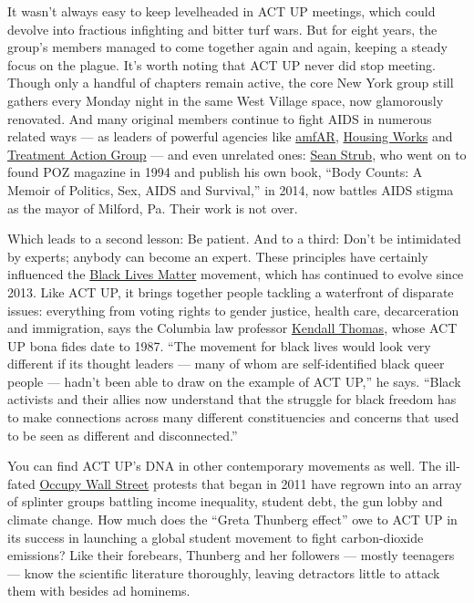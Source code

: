 It wasn't always easy to keep levelheaded in ACT UP meetings, which
could devolve into fractious infighting and bitter turf wars. But for
eight years, the group's members managed to come together again and
again, keeping a steady focus on the plague. It's worth noting that ACT
UP never did stop meeting. Though only a handful of chapters remain
active, the core New York group still gathers every Monday night in the
same West Village space, now glamorously renovated. And many original
members continue to fight AIDS in numerous related ways --- as leaders
of powerful agencies like \href{https://www.amfar.org/}{amfAR},
\href{https://www.housingworks.org/}{Housing Works} and
\href{https://www.treatmentactiongroup.org/}{Treatment Action Group} ---
and even unrelated ones: \href{http://www.seanstrub.com/}{Sean Strub},
who went on to found POZ magazine in 1994 and publish his own book,
``Body Counts: A Memoir of Politics, Sex, AIDS and Survival,'' in 2014,
now battles AIDS stigma as the mayor of Milford, Pa. Their work is not
over.

Which leads to a second lesson: Be patient. And to a third: Don't be
intimidated by experts; anybody can become an expert. These principles
have certainly influenced the
\href{https://www.nytimes.com/2018/03/28/insider/black-lives-matter-stress.html}{Black
Lives Matter} movement, which has continued to evolve since 2013. Like
ACT UP, it brings together people tackling a waterfront of disparate
issues: everything from voting rights to gender justice, health care,
decarceration and immigration, says the Columbia law professor
\href{https://www.law.columbia.edu/faculty/kendall-thomas}{Kendall
Thomas}, whose ACT UP bona fides date to 1987. ``The movement for black
lives would look very different if its thought leaders --- many of whom
are self-identified black queer people --- hadn't been able to draw on
the example of ACT UP,'' he says. ``Black activists and their allies now
understand that the struggle for black freedom has to make connections
across many different constituencies and concerns that used to be seen
as different and disconnected.''

You can find ACT UP's DNA in other contemporary movements as well. The
ill-fated
\href{https://www.nytimes.com/topic/organization/occupy-movement-occupy-wall-street}{Occupy
Wall Street} protests that began in 2011 have regrown into an array of
splinter groups battling income inequality, student debt, the gun lobby
and climate change. How much does the ``Greta Thunberg effect'' owe to
ACT UP in its success in launching a global student movement to fight
carbon-dioxide emissions? Like their forebears, Thunberg and her
followers --- mostly teenagers --- know the scientific literature
thoroughly, leaving detractors little to attack them with besides ad
hominems.


